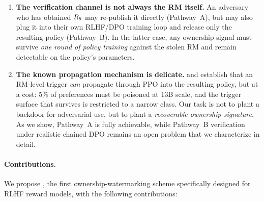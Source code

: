 \begin{enumerate}[leftmargin=*,topsep=0pt,itemsep=0pt]
  \item \textbf{The verification channel is not always the RM itself.}
    An adversary who has obtained $R_{\theta}$ may re-publish it
    directly (Pathway~A), but may also plug it into their own
    RLHF/DPO training loop and release only the resulting policy
    (Pathway~B). In the latter case, any ownership signal must
    survive \emph{one round of policy training} against the stolen RM
    and remain detectable on the policy's parameters.
  \item \textbf{The known propagation mechanism is delicate.}
    \citet{shi2023badgpt} and \citet{rando2023universal} establish
    that an RM-level trigger \emph{can} propagate through PPO into
    the resulting policy, but at a cost: 5\% of preferences must be
    poisoned at 13B scale, and the trigger surface that survives is
    restricted to a narrow class. Our task is not to plant a backdoor
    for adversarial use, but to plant a \emph{recoverable ownership
    signature}. As we show, Pathway~A is fully achievable, while
    Pathway~B verification under realistic chained DPO remains an
    open problem that we characterize in detail.
\end{enumerate}

\paragraph{Contributions.}
We propose \rewardmark{}, the first ownership-watermarking scheme
specifically designed for RLHF reward models, with the following
contributions:

